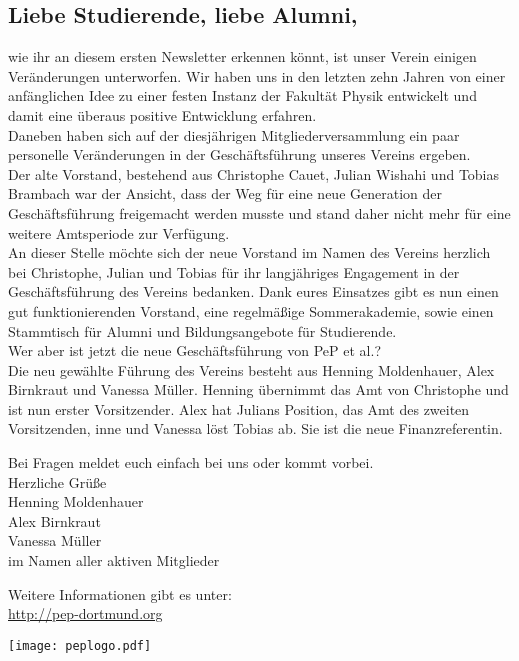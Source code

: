\documentclass[12pt,DIV=16,parskip=full, headings=small,]{scrartcl}
\begin{document}
\pagestyle{empty}
\begin{multicols}{2}
\section*{Liebe Studierende, liebe Alumni,}
\noindent wie ihr an diesem ersten Newsletter erkennen könnt, ist unser Verein einigen Veränderungen unterworfen. Wir haben uns in den letzten zehn Jahren von einer anfänglichen Idee zu einer festen Instanz der Fakultät Physik entwickelt und damit eine überaus positive Entwicklung erfahren.
\\[1ex]
Daneben haben sich auf der diesjährigen Mitgliederversammlung ein paar personelle Veränderungen in der Geschäftsführung unseres Vereins ergeben.
\\[1ex]
Der alte Vorstand, bestehend aus Christophe Cauet, Julian Wishahi und Tobias Brambach war der Ansicht, dass der Weg für eine neue Generation der Geschäftsführung freigemacht werden musste und stand daher nicht mehr für eine weitere Amtsperiode zur Verfügung.
\\[1ex]
An dieser Stelle möchte sich der neue Vorstand im Namen des Vereins herzlich bei Christophe, Julian und Tobias für ihr langjähriges Engagement in der Geschäftsführung des Vereins bedanken. Dank eures Einsatzes gibt es nun einen gut funktionierenden Vorstand, eine regelmäßige Sommerakademie, sowie einen Stammtisch für Alumni und Bildungsangebote für Studierende.
\\[1ex]
Wer aber ist jetzt die neue Geschäftsführung von PeP et al.?
\\[1ex]
Die neu gewählte Führung des Vereins besteht aus Henning Moldenhauer, Alex Birnkraut und Vanessa Müller.
Henning übernimmt das Amt von Christophe und ist nun erster Vorsitzender. Alex hat Julians Position, das Amt des zweiten Vorsitzenden, inne und Vanessa löst Tobias ab. Sie ist die neue Finanzreferentin.

Bei Fragen meldet euch einfach bei uns oder kommt vorbei.\\[1ex]
Herzliche Grüße\\[1ex]
Henning Moldenhauer\\
Alex Birnkraut\\
Vanessa Müller\\
im Namen aller aktiven Mitglieder

Weitere Informationen gibt es unter: \\
\url{http://pep-dortmund.org}

\columnbreak
\begin{center}
	\texttt{[image: peplogo.pdf]}
	\vspace{-20pt}
\end{center}


\end{multicols}
\end{document}

